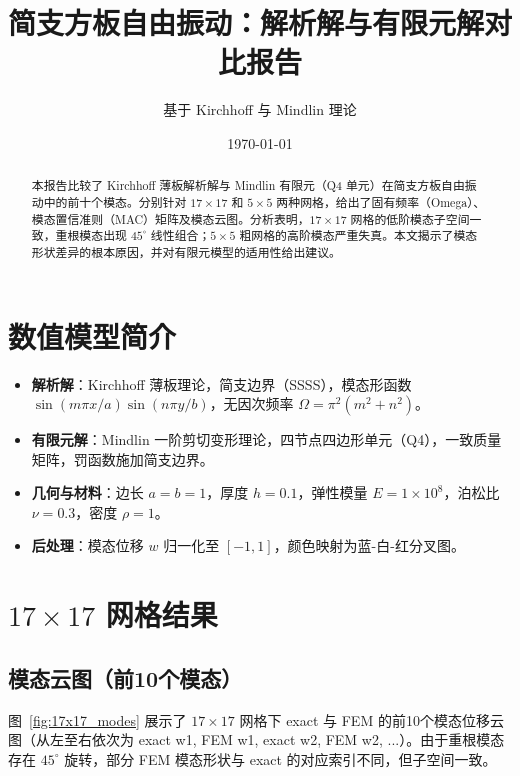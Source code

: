 \documentclass[12pt,a4paper]{article}
\title{简支方板自由振动：解析解与有限元解对比报告}
\author{基于 Kirchhoff 与 Mindlin 理论}
\date{\today}
\begin{document}
\maketitle

\begin{abstract}
本报告比较了 Kirchhoff 薄板解析解与 Mindlin 有限元（Q4 单元）在简支方板自由振动中的前十个模态。分别针对 $17\times17$ 和 $5\times5$ 两种网格，给出了固有频率（Omega）、模态置信准则（MAC）矩阵及模态云图。分析表明，$17\times17$ 网格的低阶模态子空间一致，重根模态出现 $45^\circ$ 线性组合；$5\times5$ 粗网格的高阶模态严重失真。本文揭示了模态形状差异的根本原因，并对有限元模型的适用性给出建议。
\end{abstract}

\section{数值模型简介}
\begin{itemize}
    \item \textbf{解析解}：Kirchhoff 薄板理论，简支边界（SSSS），模态形函数 $\sin(m\pi x/a)\sin(n\pi y/b)$，无因次频率 $\Omega = \pi^2(m^2+n^2)$。
    \item \textbf{有限元解}：Mindlin 一阶剪切变形理论，四节点四边形单元（Q4），一致质量矩阵，罚函数施加简支边界。
    \item \textbf{几何与材料}：边长 $a=b=1$，厚度 $h=0.1$，弹性模量 $E=1\times10^8$，泊松比 $\nu=0.3$，密度 $\rho=1$。
    \item \textbf{后处理}：模态位移 $w$ 归一化至 $[-1,1]$，颜色映射为蓝-白-红分叉图。
\end{itemize}

\clearpage
\section{$17\times17$ 网格结果}

\subsection{模态云图（前10个模态）}
图~\ref{fig:17x17_modes} 展示了 $17\times17$ 网格下 exact 与 FEM 的前10个模态位移云图（从左至右依次为 exact w1, FEM w1, exact w2, FEM w2, ...）。由于重根模态存在 $45^\circ$ 旋转，部分 FEM 模态形状与 exact 的对应索引不同，但子空间一致。
\end{document}
